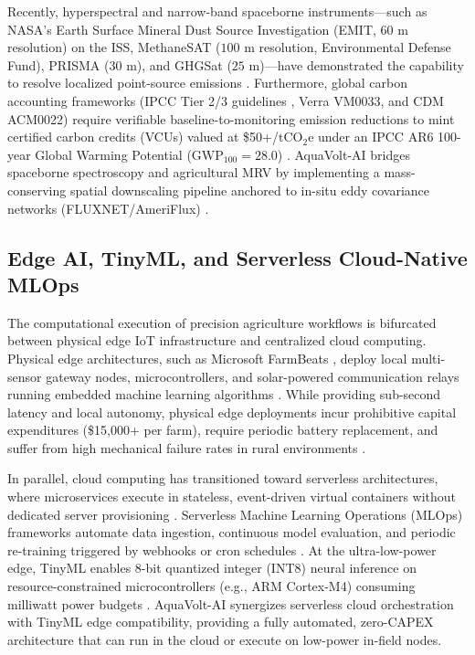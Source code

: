\documentclass[sn-mathphys-num,Numbered]{sn-jnl}
\begin{document}
Recently, hyperspectral and narrow-band spaceborne instruments—such as NASA's Earth Surface Mineral Dust Source Investigation (EMIT, $60\text{ m}$ resolution) on the ISS, MethaneSAT ($100\text{ m}$ resolution, Environmental Defense Fund), PRISMA ($30\text{ m}$), and GHGSat ($25\text{ m}$)—have demonstrated the capability to resolve localized point-source emissions \cite{Schuit2022,Falk2023,Varon2024,Wang2026}. Furthermore, global carbon accounting frameworks (IPCC Tier 2/3 guidelines \cite{IPCC2019}, Verra VM0033, and CDM ACM0022) require verifiable baseline-to-monitoring emission reductions to mint certified carbon credits (VCUs) valued at \$50+/$\text{tCO}_2\text{e}$ under an IPCC AR6 100-year Global Warming Potential ($\text{GWP}_{100} = 28.0$) \cite{Friedlingstein2023}. AquaVolt-AI bridges spaceborne spectroscopy and agricultural MRV by implementing a mass-conserving spatial downscaling pipeline anchored to in-situ eddy covariance networks (FLUXNET/AmeriFlux) \cite{Baldocchi2001}.

\subsection{Edge AI, TinyML, and Serverless Cloud-Native MLOps}\label{sec:related_edge_serverless}
The computational execution of precision agriculture workflows is bifurcated between physical edge IoT infrastructure and centralized cloud computing. Physical edge architectures, such as Microsoft FarmBeats \cite{Vasisht2017}, deploy local multi-sensor gateway nodes, microcontrollers, and solar-powered communication relays running embedded machine learning algorithms \cite{Benos2021,Alzubaidi2021,Taherizadeh2018}. While providing sub-second latency and local autonomy, physical edge deployments incur prohibitive capital expenditures (\$15,000+ per farm), require periodic battery replacement, and suffer from high mechanical failure rates in rural environments \cite{Kamilaris2018,Taherizadeh2018}.

In parallel, cloud computing has transitioned toward serverless architectures, where microservices execute in stateless, event-driven virtual containers without dedicated server provisioning \cite{Jonas2019,Castro2019}. Serverless Machine Learning Operations (MLOps) frameworks automate data ingestion, continuous model evaluation, and periodic re-training triggered by webhooks or cron schedules \cite{Balla2021,Kreuzberger2023}. At the ultra-low-power edge, TinyML enables 8-bit quantized integer (INT8) neural inference on resource-constrained microcontrollers (e.g., ARM Cortex-M4) consuming milliwatt power budgets \cite{Alzubaidi2021}. AquaVolt-AI synergizes serverless cloud orchestration with TinyML edge compatibility, providing a fully automated, zero-CAPEX architecture that can run in the cloud or execute on low-power in-field nodes.
\end{document}

